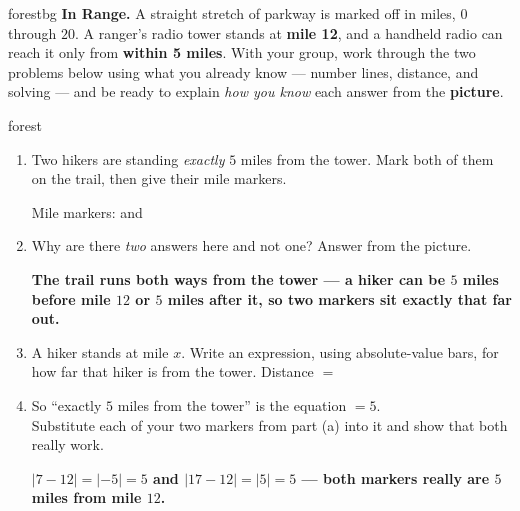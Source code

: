 \documentclass[12pt]{article}
\newcommand{\answerspace}[2]{\par\nopagebreak\noindent\begin{minipage}[t][#1][t]{\linewidth}%
  \color{keyred}\bfseries #2\end{minipage}\par}
\newcommand{\trail}{%
  \draw[->, semithick, charcoal] (-0.7,0)--(21.2,0) node[right, font=\scriptsize]{mile};
  \foreach \x in {0,...,20}{\draw[charcoal] (\x,0.26)--(\x,-0.26);}
  \foreach \x in {0,2,...,20}{\node[below, font=\scriptsize, charcoal] at (\x,-0.30){$\x$};}
  \fill[forest] (12,0) circle (3pt);
  \node[forest, font=\scriptsize, above] at (12,0.34){tower};}
\begin{document}

\vspace{0.06in}

\begin{headlinebox}{forestbg}
\textbf{In Range.} A straight stretch of parkway is marked off in miles, $0$ through $20$. A ranger's
radio tower stands at \textbf{mile 12}, and a handheld radio can reach it only from
\textbf{within 5 miles}. With your group, work through the two problems below using what you already
know --- number lines, distance, and solving --- and be ready to explain \emph{how you know} each
answer from the \textbf{picture}.
\end{headlinebox}

\vspace{0.04in}

\begin{scenariobox}{forest}
\begin{enumerate}[label=\textbf{\alph*.}, leftmargin=1.8em, itemsep=8pt]
  \item Two hikers are standing \emph{exactly} $5$ miles from the tower. Mark both of them on the
        trail, then give their mile markers.
    \begin{center}
    \end{center}
    Mile markers:  and 
  \item Why are there \emph{two} answers here and not one? Answer from the picture.
    \answerspace{1.8cm}{The trail runs both ways from the tower --- a hiker can be $5$ miles before mile $12$ or $5$ miles after it, so two markers sit exactly that far out.}
  \item A hiker stands at mile $x$. Write an expression, using absolute-value bars, for how far that
        hiker is from the tower. \quad Distance $=$ 
  \item So ``exactly $5$ miles from the tower'' is the equation  $= 5$. \\[4pt]
        Substitute each of your two markers from part (a) into it and show that both really work.
    \answerspace{2.0cm}{$|7-12| = |{-5}| = 5$ and $|17-12| = |5| = 5$ --- both markers really are $5$ miles from mile $12$.}
\end{enumerate}
\end{scenariobox}
\end{document}
